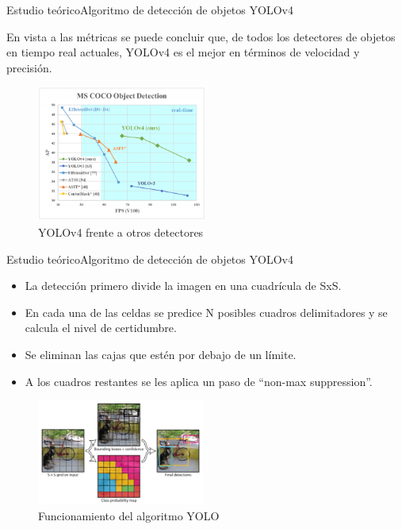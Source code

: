 \begin{frame}{Estudio teórico}{Algoritmo de detección de objetos YOLOv4}

\justifying
En vista a las métricas se puede concluir que, de todos los detectores de objetos en tiempo real actuales, YOLOv4 es el mejor en términos de velocidad y precisión.

\begin{figure}[ht]
\centering
\includegraphics[width=0.5\textwidth]{Images/estudio-teorico/yolov4-vs-others.png}
\caption{\label{fig:yolov4-vs-others}YOLOv4 frente a otros detectores}
\end{figure}

\end{frame}


\begin{frame}{Estudio teórico}{Algoritmo de detección de objetos YOLOv4}

\begin{itemize}
    \justifying
    \item La detección primero divide la imagen en una cuadrícula de SxS.
    \item En cada una de las celdas se predice N posibles cuadros delimitadores y se calcula el nivel de certidumbre.
    \item Se eliminan las cajas que estén por debajo de un límite.
    \item A los cuadros restantes se les aplica un paso de ``non-max suppression''.
\end{itemize}

\begin{figure}[ht]
\centering
\includegraphics[width=0.49\textwidth]{Images/estudio-teorico/funcionamiento-yolo.jpg}
\caption{\label{fig:funcionamiento-yolo}Funcionamiento del algoritmo YOLO}
\end{figure}

\end{frame}

